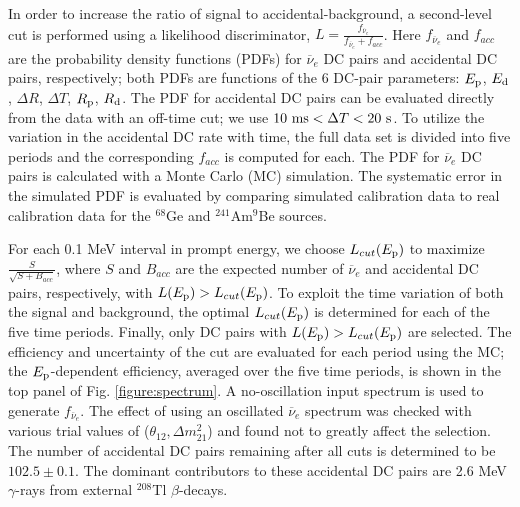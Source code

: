 \documentclass[aps,prc,twocolumn,groupedaddress,showpacs,amsmath,amssymb,floatfix,superscriptaddress]{revtex4}
\begin{document}
In order to increase the ratio of signal to accidental-background, a second-level cut is performed using a likelihood discriminator, $L = \frac{f_{\overline{\nu}_{e}}}{f_{\overline{\nu}_{e}} + f_{acc}}$.  Here $f_{\overline{\nu}_{e}}$ and $f_{acc}$  are the probability density functions (PDFs) for $\overline{\nu}_{e}$ DC pairs and accidental DC pairs, respectively; both PDFs are functions of the 6 DC-pair parameters: $E_{\rm p}$, $E_{\rm d}$, $\Delta R$, $\Delta T$, $R_{\rm p}$, $R_{\rm d}$. The PDF for accidental DC pairs can be evaluated directly from the data with an off-time cut; we use  $10 ~ {\rm ms}  < \Delta T <  20 ~{\rm s}$.   To utilize the variation in the accidental DC rate with time, the full data set is divided into five periods and the corresponding $f_{acc}$ is computed for each.  The PDF for $\overline{\nu}_{e}$ DC pairs is calculated with a Monte Carlo (MC) simulation.  The systematic error in the simulated PDF is evaluated by comparing simulated calibration data to real calibration data for the $^{68}$Ge and $^{241}$Am$^{9}$Be sources. 

For each 0.1 MeV interval in prompt energy, we choose $L_{cut}(E_{\rm p})$ to maximize $\frac{S}{\sqrt{S + B_{acc}}}$, where $S$ and $B_{acc}$ are the expected number of $\overline{\nu}_{e}$ and accidental DC pairs, respectively, with $L(E_{\rm p}) > L_{cut}(E_{\rm p})$. To exploit the time variation of both the signal and background, the optimal $L_{cut}(E_{\rm p})$ is determined for each of the five time periods. Finally, only DC pairs with $L(E_{\rm p}) > L_{cut}(E_{\rm p})$ are selected.  The efficiency and uncertainty of the cut are evaluated for each period using the MC; the \mbox{$E_{\rm p}$-dependent} efficiency, averaged over the five time periods, is shown in the top panel of Fig. \ref{figure:spectrum}. A no-oscillation input spectrum is used to generate $f_{\overline{\nu}_{e}}$.  The effect of using an oscillated $\overline{\nu}_{e}$ spectrum was checked with various trial values of ($\theta_{12},  \Delta m^{2}_{21}$) and found not to greatly affect the selection.  The number of accidental DC pairs remaining after all cuts is determined to be $102.5 \pm 0.1$. The dominant contributors to these accidental DC pairs are 2.6 MeV $\gamma$-rays from external $^{208}$Tl $\beta$-decays. 
\end{document}
